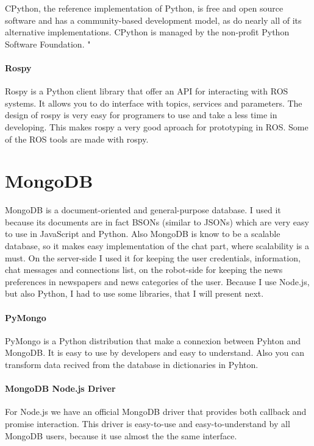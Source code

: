 CPython, the reference implementation of Python, is free and open source software and has a community-based
development model, as do nearly all of its alternative implementations. CPython is managed by the non-profit Python
Software Foundation.
" \cite{van2007python}
\paragraph{Rospy}
Rospy is a Python client library that offer an API for interacting with ROS systems.
It allows you to do interface with topics, services and parameters. The design of rospy
is very easy for programers to use and take a less time in developing. This makes rospy
a very good aproach for prototyping in ROS. Some of the ROS tools are made with rospy.


\section{MongoDB}
\label{sec:mongo}
MongoDB \cite{chodorow2013mongodb} is a document-oriented and general-purpose database. I used it because
its documents are in fact BSONs (similar to JSONs) which are very easy to use in JavaScript and Python.
Also MongoDB is know to be a scalable database, so it makes easy implementation of
the chat part, where scalability is a must. On the server-side I used it for keeping
the user credentials, information, chat messages and connections list, on the robot-side
for keeping the news preferences in newspapers and news categories of the user. Because I use Node.js,
but also Python, I had to use some libraries, that I will present next.
\paragraph{PyMongo}
PyMongo is a Python distribution that make a connexion between Pyhton and MongoDB. It is easy to use by
developers and easy to understand. Also you can transform data recived from the database in dictionaries
in Pyhton.
\paragraph{MongoDB Node.js Driver}
For Node.js we have an official MongoDB driver that provides both callback and promise interaction.
This driver is easy-to-use and easy-to-understand by all MongoDB users, because it use almost the
the same interface.
